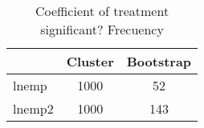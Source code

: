 \begin{table}[htbp]\centering
\caption{Coefficient of treatment significant? Frecuency}
\begin{tabular}{l*{2}{c}}
\toprule
            &     Cluster&   Bootstrap\\
\midrule
lnemp       &        1000&          52\\
lnemp2      &        1000&         143\\
\bottomrule
\end{tabular}
\end{table}
